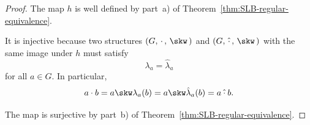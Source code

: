 \begin{proof}
    The map $h$ is well defined by part~a) of Theorem~\ref{thm:SLB-regular-equivalence}.

    It is injective because two structures $(G,\,\cdot\,,\,\skw\,)$ and $(G,\,\mathbin{\hat\cdot}\,,\,\skw\,)$ with the same image under $h$ must satisfy
    $$
        \lambda_a = \hat\lambda_a
    $$
    for all $a\in G$. In particular,
    $$
        a\cdot b = a\skw\lambda_a(b) = a\skw\hat\lambda_a(b)
            = a\mathbin{\hat\cdot}b.
    $$

    The map is surjective by part~b) of Theorem~\ref{thm:SLB-regular-equivalence}.
\end{proof}